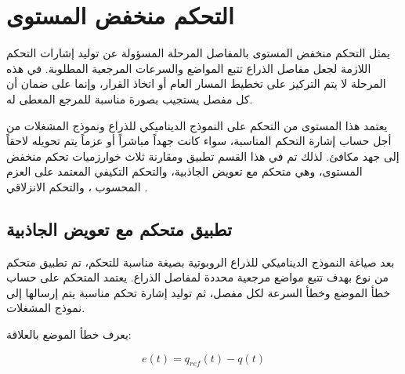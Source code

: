 \section{التحكم منخفض المستوى }



يمثل التحكم منخفض المستوى بالمفاصل  المرحلة المسؤولة عن توليد إشارات التحكم اللازمة لجعل مفاصل الذراع تتبع المواضع والسرعات المرجعية المطلوبة. في هذه المرحلة لا يتم التركيز على تخطيط المسار العام أو اتخاذ القرار، وإنما على ضمان أن كل مفصل يستجيب بصورة مناسبة للمرجع المعطى له.

يعتمد هذا المستوى من التحكم على النموذج الديناميكي للذراع ونموذج المشغلات من أجل حساب إشارة التحكم المناسبة، سواء كانت جهداً مباشراً أو عزماً يتم تحويله لاحقاً إلى جهد مكافئ. لذلك تم في هذا القسم تطبيق ومقارنة ثلاث خوارزميات تحكم منخفض المستوى، وهي متحكم  مع تعويض الجاذبية، والتحكم التكيفي المعتمد على العزم المحسوب ، والتحكم الانزلاقي .




























\subsection{تطبيق متحكم  مع تعويض الجاذبية}
\label{subsec:pid_gravity_compensation}

بعد صياغة النموذج الديناميكي للذراع الروبوتية بصيغة مناسبة للتحكم، تم تطبيق متحكم من نوع  بهدف تتبع مواضع مرجعية محددة لمفاصل الذراع. يعتمد المتحكم على حساب خطأ الموضع وخطأ السرعة لكل مفصل، ثم توليد إشارة تحكم مناسبة يتم إرسالها إلى نموذج المشغلات.

يعرف خطأ الموضع بالعلاقة:

\begin{equation}
e(t)=q_{ref}(t)-q(t)
\label{eq:pid_position_error}
\end{equation}

